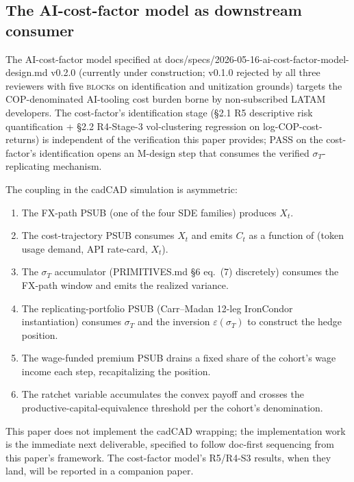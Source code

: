 \documentclass[11pt,letterpaper]{article}
\newcommand{\sigmaT}{\sigma_{T}}
\newcommand{\epsT}{\varepsilon(\sigmaT)}
\begin{document}
\subsection{The AI-cost-factor model as downstream consumer}
\label{sec:cadcad:cost-factor}

The AI-cost-factor model specified at
\textsf{docs/specs/2026-05-16-ai-cost-factor-model-design.md} v0.2.0
(currently under construction; v0.1.0 rejected by all three reviewers
with five \textsc{block}s on identification and unitization grounds)
targets the COP-denominated AI-tooling cost burden borne by
non-subscribed LATAM developers. The cost-factor's identification stage
(\S2.1 R5 descriptive risk quantification + \S2.2 R4-Stage-3 vol-clustering
regression on log-COP-cost-returns) is independent of the
verification this paper provides; PASS on the cost-factor's
identification opens an M-design step that consumes the verified
$\sigmaT$-replicating mechanism.

The coupling in the cadCAD simulation is asymmetric:
\begin{enumerate}
    \item The FX-path PSUB (one of the four SDE families) produces $X_t$.
    \item The cost-trajectory PSUB consumes $X_t$ and emits $C_t$ as a
        function of (token usage demand, API rate-card, $X_t$).
    \item The $\sigmaT$ accumulator (PRIMITIVES.md \S6 eq.~(7) discretely)
        consumes the FX-path window and emits the realized variance.
    \item The replicating-portfolio PSUB (Carr--Madan 12-leg IronCondor
        instantiation) consumes $\sigmaT$ and the inversion
        $\epsT$ to construct the hedge position.
    \item The wage-funded premium PSUB drains a fixed share of the
        cohort's wage income each step, recapitalizing the position.
    \item The ratchet variable accumulates the convex payoff and crosses
        the productive-capital-equivalence threshold per the cohort's
        denomination.
\end{enumerate}

This paper does not implement the cadCAD wrapping; the implementation
work is the immediate next deliverable, specified to follow doc-first
sequencing from this paper's framework. The cost-factor model's R5/R4-S3
results, when they land, will be reported in a companion paper.
\end{document}
